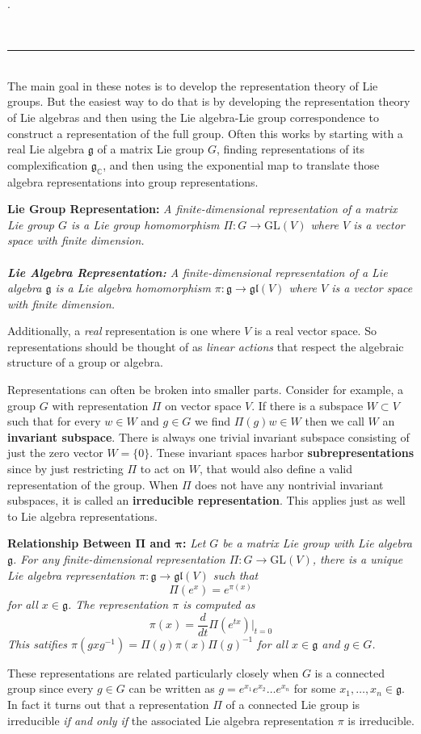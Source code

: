\documentclass{article}
\def \*#1{\boldsymbol{#1}}
\renewcommand{\t}[1]{\text{#1}}
\newcommand{\header}[1]{
	\vspace{1em}
	\noindent\raisebox{-0.5em}{\Large\textbf{#1}}\\
	\noindent\textcolor{MidnightBlue}{\rule{\textwidth}{2pt}}\\
}
\newcommand{\definition}[2]{
	\begin{center}
		\begin{tcolorbox}[colframe=MidnightBlue, colback=black!5, arc=2mm, outer arc=0.5mm, width=\linewidth, left=2mm, right=2mm]
			\textbf{#1:} \emph{#2}	
		\end{tcolorbox}
	\end{center}\noindent}
\begin{document}
.


\newpage
\header{Representation Theory}
The main goal in these notes is to develop the representation theory of Lie groups. But the easiest way to do that is by developing the representation theory of Lie algebras and then using the Lie algebra-Lie group correspondence to construct a representation of the full group. Often this works by starting with a real Lie algebra $\mathfrak{g}$ of a matrix Lie group $G$, finding representations of its complexification $\mathfrak{g}_\mathbb{C}$, and then using the exponential map to translate those algebra representations into group representations.
\definition{Lie Group Representation}{A finite-dimensional representation of a matrix Lie group $G$ is a Lie group homomorphism $\Pi:G\to\t{GL}(V)$ where $V$ is a vector space with finite dimension.
\\
\\\textbf{Lie Algebra Representation: }A finite-dimensional representation of a Lie algebra $\mathfrak{g}$ is a Lie algebra homomorphism $\pi:\mathfrak{g}\to\mathfrak{gl}(V)$ where $V$ is a vector space with finite dimension.}
Additionally, a \emph{real} representation is one where $V$ is a real vector space. So representations should be thought of as \emph{linear actions} that respect the algebraic structure of a group or algebra. 

Representations can often be broken into smaller parts. Consider for example, a group $G$ with representation $\Pi$ on vector space $V$. If there is a subspace $W\subset V$ such that for every $w\in W$ and $g\in G$ we find $\Pi(g)w\in W$ then we call $W$ an \textbf{invariant subspace}. There is always one trivial invariant subspace consisting of just the zero vector $W=\{0\}$. Tnese invariant spaces harbor \textbf{subrepresentations} since by just restricting $\Pi$ to act on $W$, that would also define a valid representation of the group. When $\Pi$ does not have any nontrivial invariant subspaces, it is called an \textbf{irreducible representation}. This applies just as well to Lie algebra representations.
\definition{Relationship Between $\*\Pi$ and $\*\pi$}{Let $G$ be a matrix Lie group with Lie algebra $\mathfrak{g}$. For any finite-dimensional representation $\Pi:G\to\t{GL}(V)$, there is a unique Lie algebra representation $\pi:\mathfrak{g}\to\mathfrak{gl}(V)$ such that
$$ \Pi(e^{x})=e^{\pi(x)} $$
for all $x\in\mathfrak{g}$. The representation $\pi$ is computed as
$$ \pi(x) = \frac{d}{dt}\Pi(e^{tx})\big|_{t=0} $$
This satifies $\pi(gxg^{-1})=\Pi(g)\pi(x)\Pi(g)^{-1}$ for all $x\in\mathfrak{g}$ and $g\in G$.}
These representations are related particularly closely when $G$ is a connected group since every $g\in G$ can be written as $g=e^{x_1}e^{x_2}\dots e^{x_n}$ for some $x_1,\dots,x_n\in\mathfrak{g}$. In fact it turns out that a representation $\Pi$ of a connected Lie group is irreducible \emph{if and only if} the associated Lie algebra representation $\pi$ is irreducible.
\end{document}
